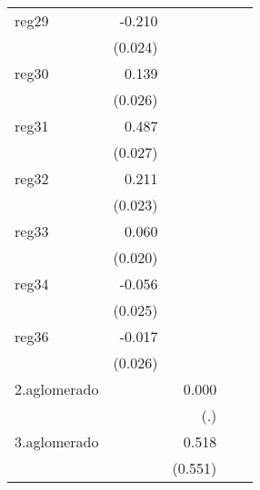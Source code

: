 {\begin{longtable}{l*{4}{D{.}{.}{-1}}}
\addlinespace
reg29       &      -0.210\sym{***}&                     &                     &                     \\
            &     (0.024)         &                     &                     &                     \\
\addlinespace
reg30       &       0.139\sym{***}&                     &                     &                     \\
            &     (0.026)         &                     &                     &                     \\
\addlinespace
reg31       &       0.487\sym{***}&                     &                     &                     \\
            &     (0.027)         &                     &                     &                     \\
\addlinespace
reg32       &       0.211\sym{***}&                     &                     &                     \\
            &     (0.023)         &                     &                     &                     \\
\addlinespace
reg33       &       0.060\sym{**} &                     &                     &                     \\
            &     (0.020)         &                     &                     &                     \\
\addlinespace
reg34       &      -0.056\sym{*}  &                     &                     &                     \\
            &     (0.025)         &                     &                     &                     \\
\addlinespace
reg36       &      -0.017         &                     &                     &                     \\
            &     (0.026)         &                     &                     &                     \\
\addlinespace
2.aglomerado&                     &       0.000         &                     &                     \\
            &                     &         (.)         &                     &                     \\
\addlinespace
3.aglomerado&                     &       0.518         &                     &                     \\
            &                     &     (0.551)         &                     &                     \\

\end{longtable}}
